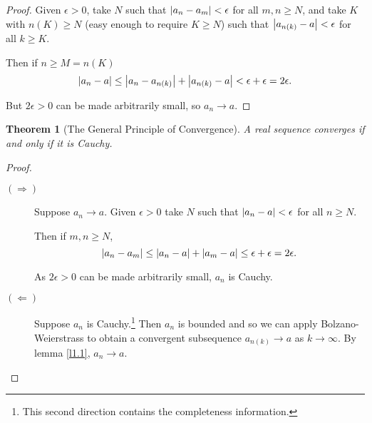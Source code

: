 \documentclass{notes}
\theoremstyle{plain}
\newtheorem{theorem}[proposition]{Theorem}
\begin{document}
\begin{proof}
Given $\epsilon > 0 $, take $ N $ such that $\left|a_{n}-a_{m}\right|< 
\epsilon$ for all $ m,n \geq N $, and take $ K $ with $ n(K) 
\geq N $ (easy enough to require $ K \geq N $) such that
$\left|a_{n(k)}-a\right| < \epsilon$ for all $ k \geq K $.

Then if $ n \geq M = n(K) $
\[
\left|a_{n}-a\right| \leq \left|a_{n}-a_{n(k)}\right| + \left|a_{n(k)}-a\right| < \epsilon + 
\epsilon = 2 \epsilon.
\]

But $ 2 \epsilon > 0$ can be made arbitrarily small, so $ a_{n} 
\to a $.
\end{proof}

\begin{theorem}[The General Principle of Convergence]
A real sequence converges if and only if it is Cauchy.
\end{theorem}

\begin{proof}
\begin{description}
\item[$ (\Rightarrow) $] Suppose $ a_{n} \to a $.
Given $ \epsilon>0 $ take $ N $ such that $ \left|a_{n}-a\right|< \epsilon $ 
for all $ n \geq N $.

Then if $ m,n \geq N $,
\[
\left|a_{n}-a_{m}\right| \leq \left|a_{n}-a\right| + \left|a_{m}-a\right| 
\leq \epsilon + \epsilon = 2 \epsilon.
\]

As $ 2 \epsilon > 0$ can be made arbitrarily small, $ a_{n} $ is Cauchy.

\item[$ (\Leftarrow) $]
Suppose $ a_{n} $ is Cauchy.\footnote{This second direction contains the completeness information.}
Then $ a_{n} $ is bounded and so we can apply Bolzano-Weierstrass 
to obtain a convergent subsequence $ a_{n(k)}\to a $ as $ 
k \to \infty $.
By lemma \ref{l1.1}, $ a_{n} \to a $.
\end{description}
\end{proof}
\end{document}
